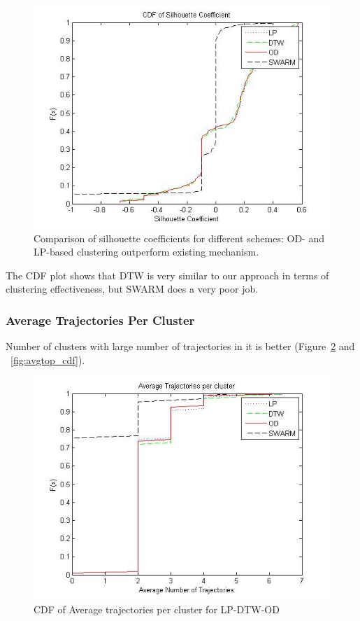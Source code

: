 \begin{figure}
\centering     
\includegraphics[scale=0.3]{figs/testing_sil.jpg}
\caption{Comparison of silhouette coefficients for different schemes: OD- and LP-based clustering outperform existing mechanism. }
\label{fig:sil_cdf}  
\end{figure}

The CDF plot shows that  DTW is very similar to our approach in terms of clustering effectiveness, but SWARM does a very poor job. 

\subsubsection{Average Trajectories Per Cluster}
Number of clusters with large number of trajectories in it is better (Figure~\ref{fig:avg_cdf} and ~\ref{fig:avgtop_cdf}). 

\begin{figure}[H]
\centering     
\includegraphics[scale=0.3]{figs/avg.jpg}
\caption{CDF of Average trajectories per cluster for LP-DTW-OD}
\label{fig:avg_cdf}  
\end{figure} 

